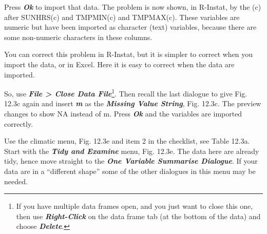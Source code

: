 \documentclass[
  letterpaper,
  DIV=11,
  numbers=noendperiod]{scrreprt}
\begin{document}
Press \textbf{\emph{Ok}} to import that data. The problem is now shown,
in R-Instat, by the (c) after SUNHRS(c) and TMPMIN(c) and TMPMAX(c).
These variables are numeric but have been imported as character (text)
variables, because there are some non-numeric characters in these
columns.

You can correct this problem in R-Instat, but it is simpler to correct
when you import the data, or in Excel. Here it is easy to correct when
the data are imported.

So, use \textbf{\emph{File \textgreater{} Close Data File}}\footnote{If
  you have multiple data frames open, and you just want to close this
  one, then use \textbf{\emph{Right-Click}} on the data frame tab (at
  the bottom of the data) and choose \textbf{\emph{Delete}}.}. Then
recall the last dialogue to give Fig. 12.3c again and insert
\textbf{\emph{m}} as the \textbf{\emph{Missing Value String}}, Fig.
12.3c. The preview changes to show NA instead of m. Press
\textbf{\emph{Ok}} and the variables are imported correctly.

Use the climatic menu, Fig. 12.3e and item 2 in the checklist, see Table
12.3a. Start with the \textbf{\emph{Tidy and Examine}} menu, Fig. 12.3e.
The data here are already tidy, hence move straight to the
\textbf{\emph{One Variable Summarise Dialogue}}. If your data are in a
``different shape'' some of the other dialogues in this menu may be
needed.
\end{document}
